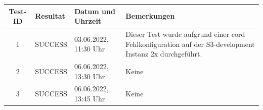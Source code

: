 \begin{table}[H]
  \begin{tabularx}{\linewidth}[H]{|c|l|l|X|}
    \hline
    \rowcolor{PrimaryColor!30} \textbf{Test-ID} & \textbf{Resultat} & \textbf{Datum und Uhrzeit} & \textbf{Bemerkungen}                                                                                    \\
    \hline
    1                                           & SUCCESS           & 03.06.2022, 11:30 Uhr      & Dieser Test wurde aufgrund einer \gls{cord} Fehlkonfiguration auf der S3-development Instanz 2x durchgeführt. \\
    \hline
    2                                           & SUCCESS           & 06.06.2022, 13:30 Uhr      & Keine                                                                                                   \\
    \hline
    3                                           & SUCCESS           & 06.06.2022, 13:45 Uhr      & Keine                                                                                                   \\
    \hline
  \end{tabularx}
\end{table}

